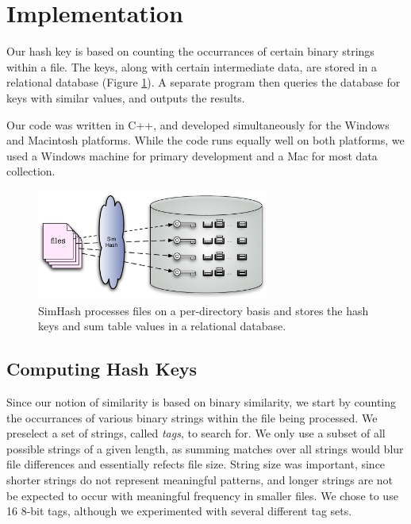 \documentclass[10pt, twocolumn]{article}
\begin{document}
\section{Implementation}

Our hash key is based on counting the occurrances of certain binary strings within a file.  The keys, along with certain intermediate data, are stored in a relational database (Figure \ref{processingFiles}).  A separate program then queries the database for keys with similar values, and outputs the results.  

 Our code was written in C++, and developed simultaneously for the Windows and Macintosh platforms. While the code runs equally well on both platforms, we used a Windows machine for primary development and a Mac for most data collection.

 \begin{figure}[h] 
 \centering
\includegraphics[width= 3in]{processFile.pdf}
\caption{SimHash processes files on a per-directory basis and stores the hash keys and sum table values in a relational database.}
\label{processingFiles} 
\end{figure}   

\subsection{Computing Hash Keys}

Since our notion of similarity is based on binary similarity, we start by counting the occurrances of various binary strings within the file being processed.  We preselect a set of strings, called {\it tags}, to search for.  We only use a subset of all possible strings of a given length, as summing matches over all strings would blur file differences and essentially refects file size.  String size was important, since shorter strings do not represent meaningful patterns, and longer strings are not be expected to occur with meaningful frequency in smaller files.  We chose to use 16 8-bit tags, although we experimented with several different tag sets.
\end{document}
